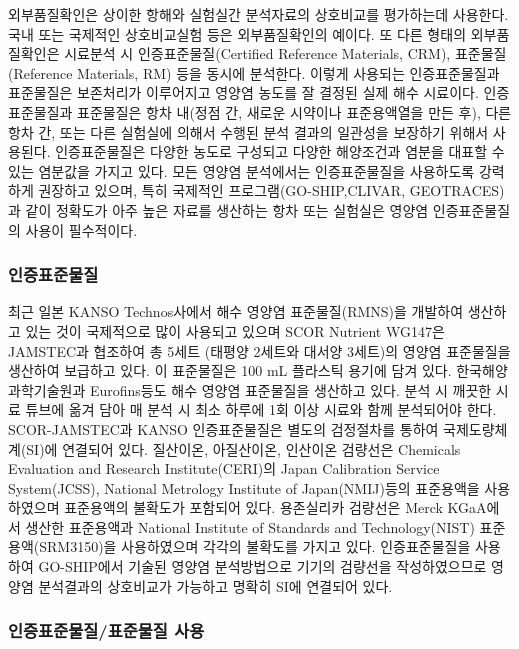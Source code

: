 \documentclass[
]{book}
\begin{document}
외부품질확인은 상이한 항해와 실험실간 분석자료의 상호비교를 평가하는데 사용한다. 국내 또는 국제적인 상호비교실험 등은 외부품질확인의 예이다. 또 다른 형태의 외부품질확인은 시료분석 시 인증표준물질(Certified Reference Materials, CRM), 표준물질 (Reference Materials, RM) 등을 동시에 분석한다. 이렇게 사용되는 인증표준물질과 표준물질은 보존처리가 이루어지고 영양염 농도를 잘 결정된 실제 해수 시료이다. 인증표준물질과 표준물질은 항차 내(정점 간, 새로운 시약이나 표준용액열을 만든 후), 다른 항차 간, 또는 다른 실험실에 의해서 수행된 분석 결과의 일관성을 보장하기 위해서 사용된다. 인증표준물질은 다양한 농도로 구성되고 다양한 해양조건과 염분을 대표할 수 있는 염분값을 가지고 있다. 모든 영양염 분석에서는 인증표준물질을 사용하도록 강력하게 권장하고 있으며, 특히 국제적인 프로그램(GO-SHIP,CLIVAR, GEOTRACES)과 같이 정확도가 아주 높은 자료를 생산하는 항차 또는 실험실은 영양염 인증표준물질의 사용이 필수적이다.

\hypertarget{uxc778uxc99duxd45cuxc900uxbb3cuxc9c8}{%
\subsubsection{인증표준물질}\label{uxc778uxc99duxd45cuxc900uxbb3cuxc9c8}}

최근 일본 KANSO Technos사에서 해수 영양염 표준물질(RMNS)을 개발하여 생산하고 있는 것이 국제적으로 많이 사용되고 있으며 SCOR Nutrient WG147은 JAMSTEC과 협조하여 총 5세트 (태평양 2세트와 대서양 3세트)의 영양염 표준물질을 생산하여 보급하고 있다. 이 표준물질은 100 mL 플라스틱 용기에 담겨 있다. 한국해양과학기술원과 Eurofins등도 해수 영양염 표준물질을 생산하고 있다. 분석 시 깨끗한 시료 튜브에 옮겨 담아 매 분석 시 최소 하루에 1회 이상 시료와 함께 분석되어야 한다. SCOR-JAMSTEC과 KANSO 인증표준물질은 별도의 검정절차를 통하여 국제도량체계(SI)에 연결되어 있다. 질산이온, 아질산이온, 인산이온 검량선은 Chemicals Evaluation and Research Institute(CERI)의 Japan Calibration Service System(JCSS), National Metrology Institute of Japan(NMIJ)등의 표준용액을 사용하였으며 표준용액의 불확도가 포함되어 있다. 용존실리카 검량선은 Merck KGaA에서 생산한 표준용액과 National Institute of Standards and Technology(NIST) 표준용액(SRM3150)을 사용하였으며 각각의 불확도를 가지고 있다. 인증표준물질을 사용하여 GO-SHIP에서 기술된 영양염 분석방법으로 기기의 검량선을 작성하였으므로 영양염 분석결과의 상호비교가 가능하고 명확히 SI에 연결되어 있다.

\hypertarget{uxc778uxc99duxd45cuxc900uxbb3cuxc9c8uxd45cuxc900uxbb3cuxc9c8-uxc0acuxc6a9}{%
\subsubsection{인증표준물질/표준물질 사용}\label{uxc778uxc99duxd45cuxc900uxbb3cuxc9c8uxd45cuxc900uxbb3cuxc9c8-uxc0acuxc6a9}}
\end{document}
